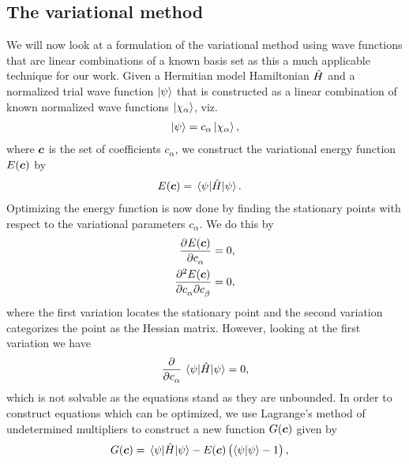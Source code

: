         \subsection{The variational method}
            We will now look at a formulation of the variational method using
            wave functions that are linear combinations of a known basis set as
            this a much applicable technique for our work.
            Given a Hermitian model Hamiltonian $\hat{H}$ and a normalized trial
            wave function $\ket{\psi}$ that is constructed as a linear
            combination of known normalized wave functions
            $\ket{\chi_{\alpha}}$, viz.
            \begin{align}
                \ket{\psi} = c_{\alpha}\ket{\chi_{\alpha}},
            \end{align}
            where $\boldsymbol{c}$ is the set of coefficients $c_{\alpha}$, we
            construct the variational energy function $E(\boldsymbol{c})$ by
            \begin{align}
                E(\boldsymbol{c})
                &= \mel{\psi}{\hat{H}}{\psi}.
            \end{align}
            Optimizing the energy function is now done by finding the
            stationary points with respect to the variational parameters
            $c_{\alpha}$.
            We do this by
            \begin{align}
                \dpd[]{E(\vfg{c})}{c_{\alpha}} &= 0,
                \\
                \dmd{E(\vfg{c})}{2}{c_{\alpha}}{}{c_{\beta}}{} &= 0,
            \end{align}
            where the first variation locates the stationary point and the
            second variation categorizes the point as the Hessian matrix.
            However, looking at the first variation we have
            \begin{align}
                \dpd{}{c_{\alpha}}\mel{\psi}{\hamil}{\psi} = 0,
            \end{align}
            which is not solvable as the equations stand \cite{szabo1996modern}
            as they are unbounded.
            In order to construct equations which can be optimized, we use
            Lagrange's method of undetermined multipliers to construct a new
            function $G(\boldsymbol{c})$ given by \cite{helgaker-molecular,
            szabo1996modern}
            \begin{align}
                G(\boldsymbol{c})
                &=
                \mel{\psi}{\hat{H}}{\psi}
                - E(\boldsymbol{c}) \left( \braket{\psi}{\psi} - 1 \right),
            \end{align}
